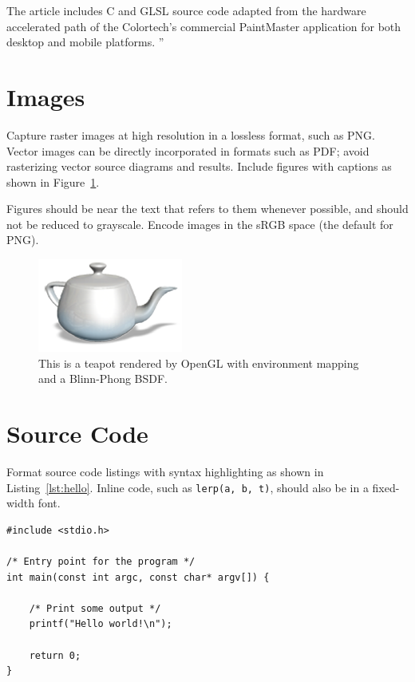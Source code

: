 \documentclass{jcgt}
\begin{document}
The article includes C and GLSL source code adapted from the hardware accelerated path of the Colortech's commercial PaintMaster application for
both desktop and mobile platforms. ''

\section{Images}

Capture raster images at high resolution in a lossless format, such as PNG.  Vector images
can be directly incorporated in formats such as PDF; avoid rasterizing vector source diagrams
and results.  Include figures with captions as shown in Figure~\ref{fig:teapot}.

Figures should be near the text that refers to them whenever possible, and should not be
reduced to grayscale.  Encode images in the sRGB space (the default for PNG).

\begin{figure}[htb]
  \centering
   \includegraphics[width=0.5\columnwidth]{teapot.png}
   \caption{\label{fig:teapot}
     This is a teapot rendered by OpenGL with environment mapping and a Blinn-Phong BSDF.}
\end{figure}

\section{Source Code}

Format source code listings with syntax highlighting as shown in Listing~\ref{lst:hello}.  Inline
code, such as \lstinline{lerp(a, b, t)}, should also be in a fixed-width font.

\begin{lstlisting}[caption={A simple C program.}, label={lst:hello}, float]
#include <stdio.h>

/* Entry point for the program */
int main(const int argc, const char* argv[]) {

    /* Print some output */
    printf("Hello world!\n");

    return 0;
}
\end{lstlisting}
\end{document}
